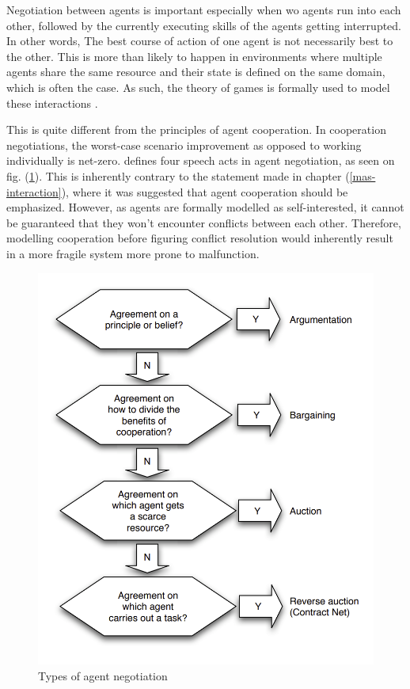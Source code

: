 \documentclass[main.tex]{subfiles}
\begin{document}
Negotiation between agents is important especially when wo agents run into each other, 
followed by the currently executing skills of the agents getting interrupted. In other words, 
The best course of action of one agent is not necessarily best to the other. This is more than
likely to happen in environments where multiple agents share the same resource and their state
is defined on the same domain, which is often the case. As such, the theory of games is formally 
used to model these interactions \cite{Binder2022}. 

This is quite different from the principles of agent cooperation. In cooperation negotiations, 
the worst-case scenario improvement as opposed to working individually is net-zero. \cite{Binder2022}
defines four speech acts in agent negotiation, as seen on fig. (\ref{fig-speech-acts}). This is 
inherently contrary to the statement made in chapter (\ref{mas-interaction}), where it was suggested 
that agent cooperation should be emphasized. However, as agents are formally modelled as self-interested, 
it cannot be guaranteed that they won't encounter conflicts between each other. Therefore, modelling 
cooperation before figuring conflict resolution would inherently result in a more fragile system 
more prone to malfunction. 

\begin{figure}[htbp]
    \centering
    \includegraphics[width=.8\textwidth]{speech-acts.png}
    \caption{Types of agent negotiation \cite{Binder2022}}
    \label{fig-speech-acts}
\end{figure}
\end{document}
